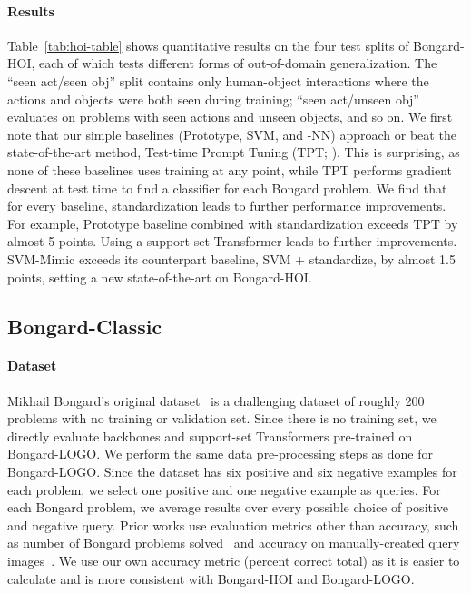 \paragraph{Results}

Table~\ref{tab:hoi-table} shows quantitative results on the four test splits of Bongard-HOI, each of which tests different forms of out-of-domain generalization. The ``seen act/seen obj'' split contains only human-object interactions where the actions and objects were both seen during training; ``seen act/unseen obj'' evaluates on problems with seen actions and unseen objects, and so on. We first note that our simple baselines (Prototype, SVM, and -NN) approach or beat the state-of-the-art method, Test-time Prompt Tuning (TPT; \citet{shu2022testtime}). This is surprising, as none of these baselines uses training at any point, while TPT performs gradient descent at test time to find a classifier for each Bongard problem. We find that for every baseline, standardization leads to further performance improvements. For example, Prototype baseline combined with standardization exceeds TPT by almost 5 points.
Using a support-set Transformer leads to further improvements. SVM-Mimic exceeds its counterpart baseline, SVM + standardize, by almost 1.5 points, setting a new state-of-the-art on Bongard-HOI.

\subsection{Bongard-Classic}
\paragraph{Dataset} Mikhail Bongard's original dataset~\cite{foundalis, yun2020deeper} is a challenging dataset of roughly 200 problems with no training or validation set. Since there is no training set, we directly evaluate backbones and support-set Transformers pre-trained on Bongard-LOGO. We perform the same data pre-processing steps as done for Bongard-LOGO. Since the dataset has six positive and six negative examples for each problem, we select one positive and one negative example as queries. For each Bongard problem, we average results over every possible choice of positive and negative query. Prior works use evaluation metrics other than accuracy, such as number of Bongard problems solved~\cite{youssef2022solution} and accuracy on manually-created query images~\cite{yun2020deeper}. We use our own accuracy metric (percent correct total) as it is easier to calculate and is more consistent with Bongard-HOI and Bongard-LOGO.

